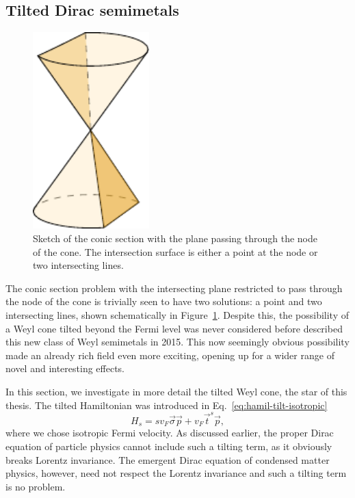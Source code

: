 \subsection{Tilted Dirac semimetals}
\label{sec:typeii}

\begin{figure}[ht]
  \centering
  \includegraphics[width=0.4\textwidth]{figures/conicSection}
  \caption{Sketch of the conic section with the plane passing through the node of the cone. The intersection surface is either a point at the node or two intersecting lines. \label{fig:conic-section-sketch}}
\end{figure}

The conic section problem with the intersecting plane restricted to pass through the node of the cone is trivially seen to have two solutions: a point and two intersecting lines, shown schematically in Figure~\ref{fig:conic-section-sketch}.
Despite this, the possibility of a Weyl cone tilted beyond the Fermi level was never considered before \textcite{soluyanovTypeIIWeylSemimetals2015} described this new class of Weyl semimetals in 2015.
This now seemingly obvious possibility made an already rich field even more exciting, opening up for a wider range of novel and interesting effects.

In this section, we investigate in more detail the tilted Weyl cone, the star of this thesis.
The tilted Hamiltonian was introduced in Eq.~\eqref{eq:hamil-tilt-isotropic}
\[
H_s = s v_F \vec{\sigma} \vec{p} + v_F \vec{t}^{s} \vec{p},
\]
where we chose isotropic Fermi velocity.
As discussed earlier, the proper Dirac equation of particle physics cannot include such a tilting term, as it obviously breaks Lorentz invariance.
The emergent Dirac equation of condensed matter physics, however, need not respect the Lorentz invariance and such a tilting term is no problem.

